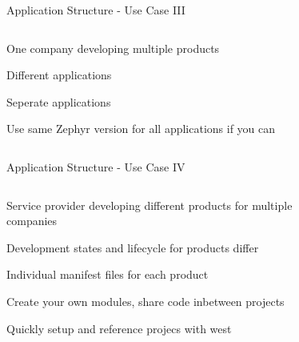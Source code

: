 \documentclass[10pt, aspectratio=169]{beamer}
\begin{document}
\begin{frame}[fragile]{Application Structure - Use Case III}
  \begin{columns}
    \begin{column}{0.6\textwidth}
      \begin{description}
         \item[Who] One company developing multiple products
         \item[What] Different applications
         \item[Solution] Seperate applications
         \item Use same Zephyr version for all applications if you can
      \end{description}
    \end{column}
    \begin{column}{0.4\textwidth}
      \begin{figure}
        \hspace*{-0.5cm}
        
      \end{figure}
    \end{column}
  \end{columns}
\end{frame}
\begin{frame}[fragile]{Application Structure - Use Case IV}
  \begin{columns}
    \begin{column}{0.6\textwidth}
      \begin{description}
         \item[Who] Service provider developing different products for multiple companies
         \item[What] Development states and lifecycle for products differ
         \item[Solution] Individual manifest files for each product
         \item Create your own modules, share code inbetween projects
         \item Quickly setup and reference projecs with west
      \end{description}
    \end{column}
    \begin{column}{0.4\textwidth}
      \begin{figure}
        \hspace*{-0.5cm}
        
      \end{figure}
    \end{column}
  \end{columns}
\end{frame}
\end{document}
